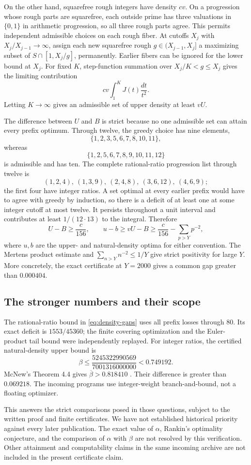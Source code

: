 On the other hand, squarefree rough integers have density \(cv\).
On a progression whose rough parts are squarefree, each outside prime
has three valuations in \(\{0,1\}\) in arithmetic progression, so all
three rough parts agree. This permits independent admissible choices
on each rough fiber. At cutoffs \(X_j\) with \(X_j/X_{j-1}\to\infty\),
assign each new squarefree rough \(g\in(X_{j-1},X_j]\) a maximizing
subset of \(S\cap[1,X_j/g]\), permanently. Earlier fibers can be ignored
for the lower bound at \(X_j\). For fixed \(K\), step-function summation
over \(X_j/K<g\le X_j\) gives the limiting contribution
\[
cv\int_1^K J(t)\frac{dt}{t^2}.
\]
Letting \(K\to\infty\) gives an admissible set of upper density at least
\(vU\).

The difference between \(U\) and \(B\) is strict because no one admissible
set can attain every prefix optimum. Through twelve, the greedy choice
has nine elements,
\[
\{1,2,3,5,6,7,8,10,11\},
\]
whereas
\[
\{1,2,5,6,7,8,9,10,11,12\}
\]
is admissible and has ten. The complete rational-ratio progression list
through twelve is
\[
(1,2,4),\ (1,3,9),\ (2,4,8),\ (3,6,12),\ (4,6,9);
\]
the first four have integer ratios. A set optimal at every earlier
prefix would have to agree with greedy by induction, so there is a
deficit of at least one at some integer cutoff at most twelve.
It persists throughout a unit interval and contributes at least
\(1/(12\cdot13)\) to the integral. Therefore
\[
U-B\ge \frac c{156},\qquad
u-b\ge vU-B\ge \frac c{156}-\sum_{p>Y}p^{-2},
\]
where \(u,b\) are the upper- and natural-density optima for either convention.
The Mertens product estimate and \(\sum_{n>Y}n^{-2}\le1/Y\)
give strict positivity for large \(Y\). More concretely, the exact
certificate at \(Y=2000\) gives a common gap greater than \(0.000404\).

\subsection{The stronger numbers and their scope}

The rational-ratio bound in \eqref{eq:density-gaps} uses all prefix losses
through \(80\). Its exact deficit is \(1553/45360\); the finite covering
optimization and the Euler-product tail bound were independently replayed.
For integer ratios, the certified natural-density upper bound is
\[
\beta\le\frac{5245322990569}{7001316000000}<0.749192.
\]
McNew's Theorem 4.4 gives \(\overline\beta>0.818410\) \cite{McNew}.
Their difference is greater than \(0.069218\). The incoming programs
use integer-weight branch-and-bound, not a floating optimizer.

This answers the strict comparisons posed in those questions, subject
to the written proof and finite certificates. We have not established
historical priority against every later publication. The exact value of
\(\alpha\), Rankin's optimality conjecture, and the comparison of
\(\alpha\) with \(\beta\) are not resolved by this verification.
Other attainment and computability claims in the same incoming archive
are not included in the present certificate claim.
